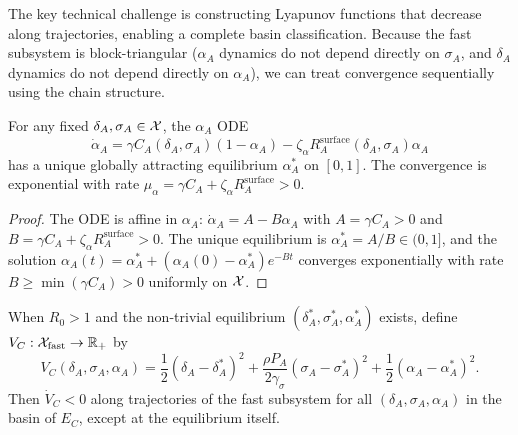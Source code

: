 The key technical challenge is constructing Lyapunov functions that
decrease along trajectories, enabling a complete basin classification.
Because the fast subsystem is block-triangular ($\alpha_A$ dynamics do
not depend directly on $\sigma_A$, and $\delta_A$ dynamics do not depend
directly on $\alpha_A$), we can treat convergence sequentially using the
chain structure.

\begin{lemma}
\label{lem:alpha-contraction}
For any fixed $\delta_A, \sigma_A \in \mathcal{X}$, the $\alpha_A$ ODE
\[
\dot{\alpha}_A = \gamma C_A(\delta_A, \sigma_A) (1 - \alpha_A)
- \zeta_\alpha R_A^{\mathrm{surface}}(\delta_A, \sigma_A) \alpha_A
\]
has a unique globally attracting equilibrium $\alpha^*_A$ on $[0,1]$.
The convergence is exponential with rate
$\mu_\alpha = \gamma C_A + \zeta_\alpha R_A^{\mathrm{surface}} > 0$.
\end{lemma}

\begin{proof}
The ODE is affine in $\alpha_A$: $\dot{\alpha}_A = A - B\alpha_A$ with
$A = \gamma C_A > 0$ and $B = \gamma C_A + \zeta_\alpha R_A^{\mathrm{surface}} > 0$.
The unique equilibrium is $\alpha^*_A = A/B \in (0,1]$, and the solution
$\alpha_A(t) = \alpha^*_A + (\alpha_A(0) - \alpha^*_A) e^{-Bt}$ converges
exponentially with rate $B \geq \min(\gamma C_A) > 0$ uniformly on $\mathcal{X}$.
\end{proof}

\begin{proposition}
\label{prop:lyapunov-ec}
When $R_0 > 1$ and the non-trivial equilibrium $(\delta^*_A, \sigma^*_A, \alpha^*_A)$
exists, define $V_C: \mathcal{X}_{\mathrm{fast}} \to \mathbb{R}_+$ by
\[
V_C(\delta_A, \sigma_A, \alpha_A) =
\frac{1}{2}(\delta_A - \delta^*_A)^2
+ \frac{\rho P_A}{2\gamma_\sigma}(\sigma_A - \sigma^*_A)^2
+ \frac{1}{2}(\alpha_A - \alpha^*_A)^2.
\]
Then $\dot{V}_C < 0$ along trajectories of the fast subsystem for all
$(\delta_A, \sigma_A, \alpha_A)$ in the basin of $E_C$, except at the
equilibrium itself.
\end{proposition}

